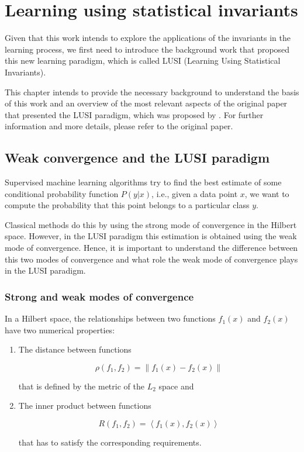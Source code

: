 
\newcommand{\Tau}{\mathcal{T}}
\newcommand{\norm}[1]{\lVert #1 \rVert}
\newcommand{\innerprod}[1]{\left< #1 \right>}
\newcommand{\set}[1]{\lbrace #1 \rbrace}

\chapter{Learning using statistical invariants} %
\label{Chapter2}

Given that this work intends to explore the applications of the invariants in the learning
process, we first need to introduce the background work that proposed this new learning
paradigm, which is called LUSI (Learning Using Statistical Invariants).

This chapter intends to provide the necessary background to understand the basis of this work
and an overview of the most relevant aspects of the original paper that presented the LUSI paradigm,
which was proposed by \cite{Vapnik2019}. For further information and more details, please
refer to the original paper.

\section{Weak convergence and the LUSI paradigm}

Supervised machine learning algorithms try to find the best estimate of some conditional probability
function $P(y | x)$, i.e., given a data point $x$, we want to compute the probability that this
point belongs to a particular class $y$.

Classical methods do this by using the strong mode of convergence in the Hilbert space. However,
in the LUSI paradigm this estimation is obtained using the weak mode of convergence. Hence, it is
important to understand the difference between this two modes of convergence and what role
the weak mode of convergence plays in the LUSI paradigm.

\subsection{Strong and weak modes of convergence}

In a Hilbert space, the relationships between two functions $f_1(x)$ and $f_2(x)$ have two
numerical properties:

\begin{enumerate}
    \item The distance between functions
    
    \[
        \rho (f_1, f_2) = \norm{f_1(x) - f_2(x)}
    \]
    
    that is defined by the metric of the $L_2$ space and
    
    \item The inner product between functions
    
    \[
        R(f_1, f_2) = \innerprod{f_1(x), f_2(x)}
    \]
    
    that has to satisfy the corresponding requirements.
\end{enumerate}

